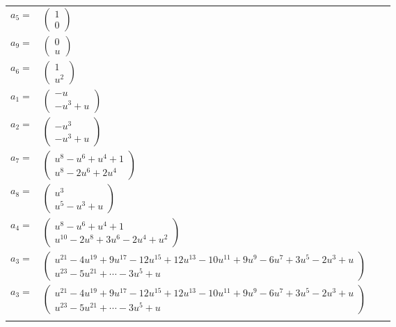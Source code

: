 \documentclass[1p]{elsarticle_modified}
\theoremstyle{definition}
\begin{document}
\begin{tabular}{m{7pt} m{180pt} m{7pt} m{180pt} }
\flushright $a_{5}=$&$\begin{pmatrix}1\\0\end{pmatrix}$ \\
\flushright $a_{9}=$&$\begin{pmatrix}0\\u\end{pmatrix}$ \\
\flushright $a_{6}=$&$\begin{pmatrix}1\\u^2\end{pmatrix}$ \\
\flushright $a_{1}=$&$\begin{pmatrix}- u\\- u^3+u\end{pmatrix}$ \\
\flushright $a_{2}=$&$\begin{pmatrix}- u^3\\- u^3+u\end{pmatrix}$ \\
\flushright $a_{7}=$&$\begin{pmatrix}u^8- u^6+u^4+1\\u^8-2 u^6+2 u^4\end{pmatrix}$ \\
\flushright $a_{8}=$&$\begin{pmatrix}u^3\\u^5- u^3+u\end{pmatrix}$ \\
\flushright $a_{4}=$&$\begin{pmatrix}u^8- u^6+u^4+1\\u^{10}-2 u^8+3 u^6-2 u^4+u^2\end{pmatrix}$ \\
\flushright $a_{3}=$&$\begin{pmatrix}u^{21}-4 u^{19}+9 u^{17}-12 u^{15}+12 u^{13}-10 u^{11}+9 u^9-6 u^7+3 u^5-2 u^3+u\\u^{23}-5 u^{21}+\cdots-3 u^5+u\end{pmatrix}$\\ \flushright $a_{3}=$&$\begin{pmatrix}u^{21}-4 u^{19}+9 u^{17}-12 u^{15}+12 u^{13}-10 u^{11}+9 u^9-6 u^7+3 u^5-2 u^3+u\\u^{23}-5 u^{21}+\cdots-3 u^5+u\end{pmatrix}$\\&\end{tabular}
\end{document}
